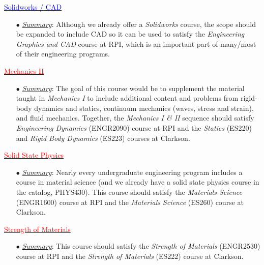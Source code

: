 \documentclass[12pt,preprint]{aastex}
\newcommand{\red}[1]{\textcolor{red}{#1}}
\newcommand{\blue}[1]{\textcolor{blue}{#1}}
\begin{document}
\vspace{-4mm}
\begin{itemize*}
\item{\underline{\blue{Solidworks / CAD}}
  \begin{itemize}
    \item[$\bullet$]{\underline{\em Summary}: Although we already offer a
      \emph{Solidworks} course, the scope should be expanded to include CAD so
      it can be used to satisfy the {\em Engineering Graphics and CAD} course at
      RPI, which is an important part of many/most of their engineering
      programs.}
  \end{itemize}
}

\item{\underline{\red{Mechanics II}}
  \begin{itemize}
    \item[$\bullet$]{\underline{\em Summary}: The goal of this course would be
      to supplement the material taught in {\em Mechanics I} to include
      additional content and problems from rigid-body dynamics and statics,
      continuum mechanics (waves, stress and strain), and fluid mechanics.
      Together, the {\em Mechanics I \& II} sequence should satisfy {\em
        Engineering Dynamics} (ENGR2090) course at RPI and the {\em Statics}
      (ES220) and {\em Rigid Body Dynamics} (ES223) courses at Clarkson.}
  \end{itemize}
}

\item{\underline{\red{Solid State Physics}}
  \begin{itemize}
    \item[$\bullet$]{\underline{\em Summary}: Nearly every undergraduate
      engineering program includes a course in material science (and we already
      have a solid state physics course in the catalog, PHYS430).  This course
      should satisfy the {\em Materials Science} (ENGR1600) course at RPI and
      the {\em Materials Science} (ES260) course at Clarkson.}
  \end{itemize}
}

\item{\underline{\red{Strength of Materials}}
  \begin{itemize}
    \item[$\bullet$]{\underline{\em Summary}: This course should satisfy the
      {\em Strength of Materials} (ENGR2530) course at RPI and the {\em Strength
        of Materials} (ES222) course at Clarkson.}
  \end{itemize}
}

\end{itemize*}
 
\end{document}
